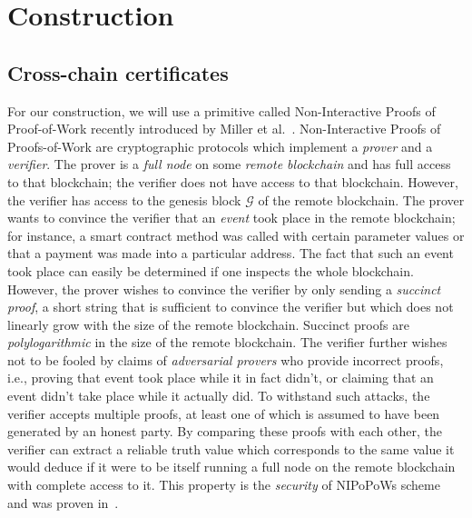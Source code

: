 \section{Construction}
\subsection*{Cross-chain certificates}
For our construction, we will use a primitive called Non-Interactive Proofs of
Proof-of-Work recently introduced by Miller et al.~\cite{nipopows}.
Non-Interactive Proofs of Proofs-of-Work are cryptographic protocols which
implement a \emph{prover} and a \emph{verifier}. The prover is a \emph{full
node} on some \emph{remote blockchain} and has full access to that blockchain;
the verifier does not have access to that blockchain. However, the
verifier has access to the genesis block $\mathcal{G}$ of the remote blockchain.
The prover wants to convince the verifier that an \emph{event} took place in the
remote blockchain; for instance, a smart contract method was called with certain
parameter values or that a payment was made into a particular address. The fact
that such an event took place can easily be determined if one inspects the whole
blockchain. However, the prover wishes to convince the verifier by only sending
a \emph{succinct proof}, a short string that is sufficient to convince the
verifier but which does not linearly grow with the size of the remote
blockchain. Succinct proofs are \emph{polylogarithmic} in the size of the remote
blockchain. The verifier further wishes not to be fooled by claims of
\emph{adversarial provers} who provide incorrect proofs, i.e., proving that
event took place while it in fact didn't, or claiming that an event didn't take
place while it actually did. To withstand such attacks, the verifier accepts
multiple proofs, at least one of which is assumed to have been generated by an
honest party. By comparing these proofs with each other, the verifier can
extract a reliable truth value which corresponds to the same value it would
deduce if it were to be itself running a full node on the remote blockchain with
complete access to it. This property is the \emph{security} of NIPoPoWs scheme
and was proven in~\cite{nipopows}.

